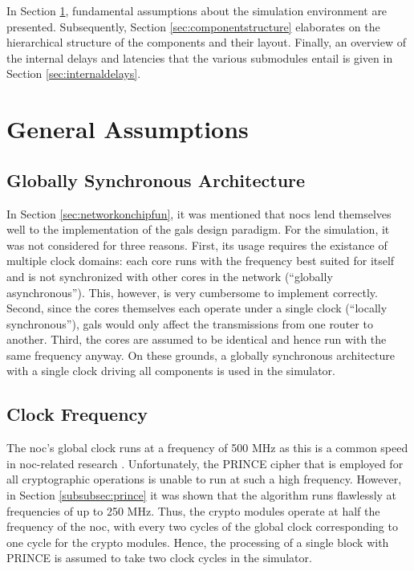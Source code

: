 In Section \ref{sec:generalass}, fundamental assumptions about the simulation environment are presented. Subsequently, Section
\ref{sec:componentstructure} elaborates on the hierarchical structure of the components and their layout. Finally, an overview of the internal delays
and latencies that the various submodules entail is given in Section \ref{sec:internaldelays}.

\section{General Assumptions}\label{sec:generalass}
\subsection{Globally Synchronous Architecture}
In Section \ref{sec:networkonchipfun}, it was mentioned that \glspl{noc} lend themselves well to the implementation of the \gls{gals} design paradigm.
For the simulation, it was not considered for three reasons. First, its usage requires the existance of multiple clock domains: each core runs with the
frequency best suited for itself and is not synchronized with other cores in the network (\enquote{globally asynchronous}). This, however, is very
cumbersome to implement correctly. Second, since the cores themselves each operate under a single clock (\enquote{locally synchronous}), \gls{gals} would
only affect the transmissions from one router to another. Third, the cores are assumed to be identical and hence run with the same frequency anyway.
On these grounds, a globally synchronous architecture with a single clock driving all components is used in the simulator.

\subsection{Clock Frequency}\label{subsec:clockfrequency}
The \gls{noc}'s global clock runs at a frequency of 500 MHz as this is a common speed in \gls{noc}-related research
\cites{frey15stateobfuscation}{frey17hardenednoc}{haas18sdrmpsoc}. Unfortunately, the PRINCE cipher that is employed for all cryptographic operations
is unable to run at
such a high frequency. However, in Section \ref{subsubsec:prince} it was shown that the algorithm runs flawlessly at frequencies of up to 250 MHz.
Thus, the crypto modules operate at half the frequency of the \gls{noc}, with every two cycles of the global clock corresponding to one
cycle for the crypto modules. Hence, the processing of a single block with PRINCE is assumed to take two clock cycles in the simulator.

